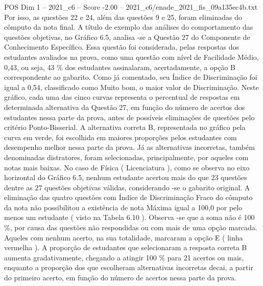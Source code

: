 \begin{textsample}{POS Dim 1 – 2021\_c6 – Score -2.00 – 2021\_c6/enade\_2021\_fis\_09a135ec4b.txt}
Por isso, as questões 22 e 24, além das questões 9 e 25, foram eliminadas do cômputo da nota final.
A título de exemplo das análises do comportamento das questões objetivas, no Gráfico 6.5, analisa -se a Questão 27 do Componente de Conhecimento Específico.
Essa questão foi considerada, pelas respostas dos estudantes avaliados na prova, como uma questão com nível de Facilidade Médio, 0,43, ou seja, 43 \% dos estudantes assinalaram, acertadamente, a opção B correspondente ao gabarito.
Como já comentado, seu Índice de Discriminação foi igual a 0,54, classificado como Muito bom, o maior valor de Discriminação.
Neste gráfico, cada uma das cinco curvas representa o percentual de respostas em determinada alternativa da Questão 27, em função do número de acertos dos estudantes nessa parte da prova, antes de possíveis eliminações de questões pelo critério Ponto-Bisserial.
A alternativa correta B, representada no gráfico pela curva em verde, foi escolhida em maiores proporções pelos estudantes com desempenho melhor nessa parte da prova.
Já as alternativas incorretas, também denominadas distratores, foram selecionadas, principalmente, por aqueles com notas mais baixas.
No caso de Física ( Licenciatura ), como se observa no eixo horizontal do Gráfico 6.5, nenhum estudante acertou mais do que 23 questões dentre as 27 questões objetivas válidas, considerando -se o gabarito original.
A eliminação das quatro questões com Índice de Discriminação Fraco do cômputo da nota não possibilitou a existência de nota Máxima igual a 100,0 por pelo menos um estudante ( visto na Tabela 6.10 ).
Observa -se que a soma não é 100 \%, por causa das questões não respondidas ou com mais de uma opção marcada.
Aqueles com nenhum acerto, na sua totalidade, marcaram a opção E ( linha vermelha ).
A proporção de estudantes que selecionaram a resposta correta B aumenta gradativamente, chegando a atingir 100 \% para 21 acertos ou mais, enquanto a proporção dos que escolheram alternativas incorretas decai, a partir do primeiro acerto, em função do número de acertos nessa parte da prova.

\end{textsample}
